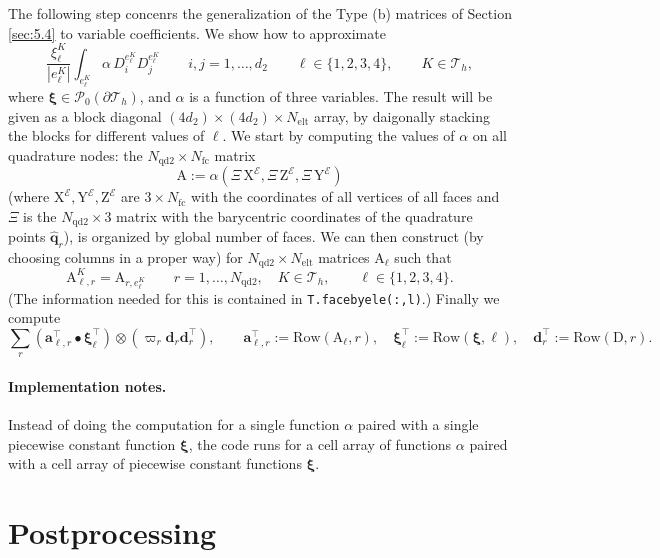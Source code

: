 \documentclass[10pt,english]{article}
\newcommand{\Nelt}{{N_{\mathrm{elt}}}}
\newcommand{\Nndb}{{N_{\mathrm{qd2}}}}
\newcommand{\Nfc}{{N_{\mathrm{fc}}}}
\newcommand{\qq}{\widehat{\mathbf q}}
\begin{document}
The following step concenrs the generalization of the Type (b) matrices of Section \ref{sec:5.4} to variable coefficients. We show how to approximate
\[
\frac{\xi^K_\ell}{|e^K_\ell|} \int_{e^K_\ell}\alpha\, D_i^{e^K_\ell}  D_j^{e^K_\ell} \qquad i,j=1,\ldots,d_2\qquad \ell\in \{1,2,3,4\}, \qquad K \in \mathcal T_h,
\]
where $\boldsymbol\xi\in \mathcal P_0(\partial \mathcal T_h)$, and $\alpha$ is a function of three variables. The result will be given as a block diagonal $(4d_2)\times (4d_2)\times \Nelt$ array, by daigonally stacking the blocks for different values of $\ell$. We start by computing the values of $\alpha$ on all quadrature nodes: the $\Nndb\times \Nfc$ matrix
\[
\mathrm A:=\alpha(\Xi\,\mathrm X^{\mathcal E},\Xi\,\mathrm Z^{\mathcal E},\Xi\,\mathrm Y^{\mathcal E})
\]
(where $\mathrm X^{\mathcal E},\mathrm Y^{\mathcal E},\mathrm Z^{\mathcal E}$ are $3\times \Nfc$ with the coordinates of all vertices of all faces and $\Xi$ is the $\Nndb\times 3$ matrix with the barycentric coordinates of the quadrature points $\qq_r$), is organized by global number of faces. We can then construct (by choosing columns in a proper way) for $\Nndb\times \Nelt$ matrices $\mathrm A_\ell$ such that
\[
\mathrm A^K_{\ell,r}=\mathrm A_{r,e^K_\ell} \qquad r=1,\ldots,\Nndb, \quad K\in \mathcal T_h, \qquad \ell\in \{1,2,3,4\}.
\]
(The information needed for this is contained in {\tt T.facebyele(:,l)}.) Finally we compute
\[
\sum_r(\mathbf a_{\ell,r}^\top\bullet\boldsymbol\xi_\ell^\top)\otimes (\varpi_r\mathbf d_r\mathbf d_r^\top), \qquad \mathbf a_{\ell,r}^\top:=\mathrm{Row}(\mathrm A_\ell,r), \quad \boldsymbol\xi_\ell^\top:=\mathrm{Row}(\boldsymbol\xi,\ell), \quad \mathbf d_r^\top:=\mathrm{Row}(\mathrm D,r).
\]
\paragraph{Implementation notes.} Instead of doing the computation for a single function $\alpha$ paired with a single piecewise constant function $\boldsymbol\xi$, the code runs for a cell array of functions $\alpha$ paired with a cell array of piecewise constant functions $\boldsymbol\xi$.






\section{Postprocessing}
\end{document}
